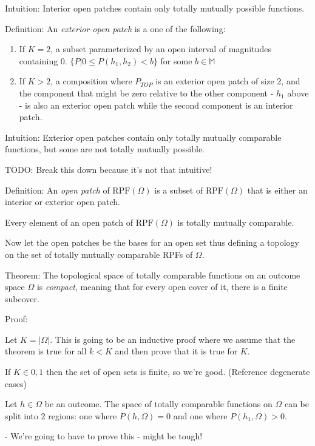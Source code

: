 \documentclass[twoside]{article}
\begin{document}
Intuition: Interior open patches contain only totally mutually possible functions.

Definition: An \textit{exterior open patch} is a one of the following:

\begin{enumerate}
  \item If \(K = 2\), a subset parameterized by an open interval of magnitudes containing 0. \(\{P | 0 \leq P(h_1, h_2) < b\}\) for some \(b \in \mathbb{M}\) 
  \item If \(K > 2\), a composition where \(P_{TOP}\) is an exterior open patch of size 2, and the component that might be zero relative to the other component - \(h_1\) above - is also an exterior open patch while the second component is an interior patch.
\end{enumerate}

Intuition: Exterior open patches contain only totally mutually comparable functions, but some are not totally mutually possible.

TODO: Break this down because it's not that intuitive!

Definition: An \textit{open patch} of \(\text{RPF}(\Omega)\) is a subset of \(\text{RPF}(\Omega)\) that is either an interior or exterior open patch.

Every element of an open patch of \(\text{RPF}(\Omega)\) is totally mutually comparable.

Now let the open patches be the bases for an open set thus defining a topology on the set of totally mutually comparable RPFs of \(\Omega\).

Theorem: The topological space of totally comparable functions on an outcome space \(\Omega\) is \textit{compact}, meaning that for every open cover of it, there is a finite subcover.

Proof:

Let \(K = |\Omega|\). This is going to be an inductive proof where we assume that the theorem is true for all \(k < K\) and then prove that it is true for \(K\).

If \(K \in {0, 1}\) then the set of open sets is finite, so we're good. (Reference degenerate cases)

Let \(h \in \Omega\) be an outcome. The space of totally comparable functions on \(\Omega\) can be split into 2 regions: one where \(P(h, \Omega) = 0\) and one where \(P(h_1, \Omega) > 0\).

- We're going to have to prove this - might be tough!
\end{document}
